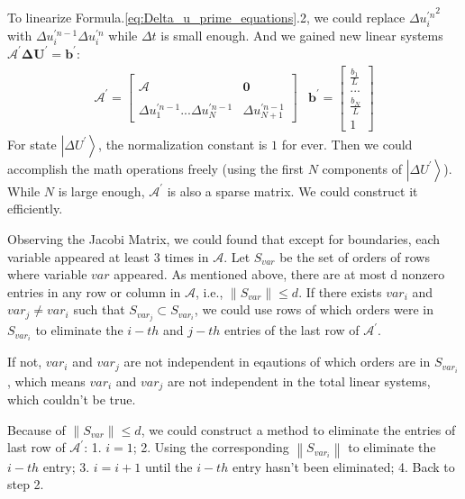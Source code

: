 \documentclass[%
 reprint,
 amsmath,amssymb,
pra,
]{revtex4-1}
\begin{document}
\begin{itemize}
To linearize Formula.\ref{eq:Delta_u_prime_equations}.2, we could replace ${\Delta u^{\prime n}_i}^2$ with $\Delta u^{\prime n - 1}_i \Delta u^{\prime n}_i$ while $\Delta t$ is small enough. And we gained new linear systems $\mathcal{A^{\prime}} \bm{\Delta U^{\prime}} = \bm{b^{\prime}}$: 
\begin{equation}
\begin{array}{cc}
	\mathcal{A^{\prime}} = \left[
	\begin{array}{cc}
		&\\
		\mathcal{A} & \bm{0}\\
		&\\
		\Delta u^{\prime n - 1}_1...\Delta u^{\prime n - 1}_N&\Delta u^{\prime n - 1}_{N+1}
	\end{array}
	\right]
	&
	\bm{b^{\prime}} = \left[
	\begin{array}{c}
		\frac{b_1}{L}\\
		...\\
		\frac{b_N}{L}\\
		1
	\end{array}
	\right]
	
\end{array}
\end{equation}
For state $\left|\Delta U^{\prime}\right\rangle$, the normalization constant is $1$ for ever. Then we could accomplish the math operations freely (using the first $N$ components of $\left|\Delta U^{\prime}\right\rangle$). While $N$ is large enough, $\mathcal{A^{\prime}}$ is also a sparse matrix. We could construct it efficiently.

\iffalse
Observing the Jacobi Matrix, we could found that except for boundaries, each variable appeared at least $3$ times in $\mathcal{A}$. Let $S_{var}$ be the set of orders of rows where variable $var$ appeared. As mentioned above, there are at most d nonzero entries in any row or column in $\mathcal{A}$, i.e., $\left\|S_{var}\right\|\leq d$. If there exists $var_i$ and $var_j\neq var_i$ such that $S_{var_j}\subset S_{var_i}$, we could use rows of which orders were in $S_{var_i}$ to eliminate the $i-th$ and $j-th$ entries of the last row of $\mathcal{A^{\prime}}$. 

If not, $var_i$ and $var_j$ are not independent in eqautions of which orders are in $S_{var_i}$,  which means $var_i$ and $var_j$ are not independent in the total linear systems, which couldn't be true. 

Because of $\left\|S_{var}\right\|\leq d$, we could construct a method to eliminate the entries of last row of $\mathcal{A^{\prime}}$: 1. $i=1$; 2. Using the corresponding $\left\|S_{var_i}\right\|$ to eliminate the $i-th$ entry; 3. $i=i+1$ until the $i-th$ entry hasn't been eliminated; 4. Back to step 2. 


\end{itemize}
\end{document}
